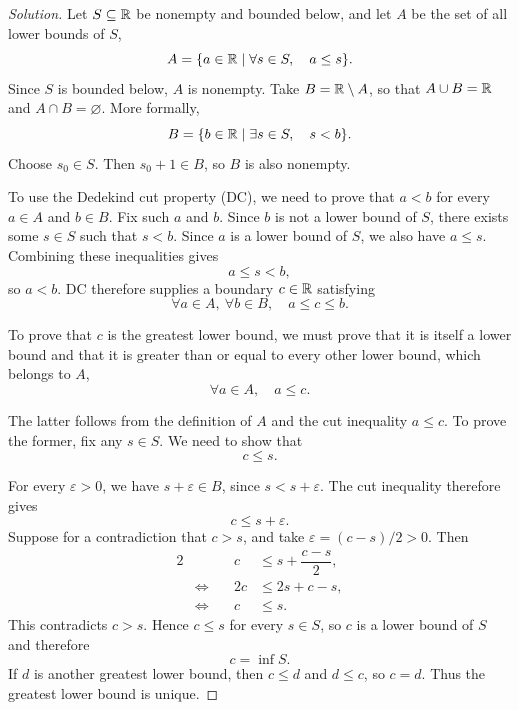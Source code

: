 \begin{proof}[Solution]
  Let $S\subseteq\mathbb{R}$ be nonempty and bounded below, and let $A$ be the
  set of all lower bounds of $S$,
  \[
    A=\{a\in\mathbb{R}\mid\forall s\in S,\quad a\leq s\}.
  \]
  Since $S$ is bounded below, $A$ is nonempty. Take $B=\mathbb{R}\setminus A$,
  so that $A\cup B=\mathbb{R}$ and $A\cap B=\varnothing$. More formally,
  \[
    B=\{b\in\mathbb{R}\mid\exists s\in S,\quad s<b\}.
  \]
  Choose $s_0\in S$. Then $s_0+1\in B$, so $B$ is also nonempty.

  To use the Dedekind cut property (DC), we need to prove that $a<b$
  for every $a\in A$ and $b\in B$. Fix such $a$ and $b$. Since $b$ is
  not a lower bound of $S$, there exists some $s\in S$ such that $s<b$.
  Since $a$ is a lower bound of $S$, we also have $a\leq s$. Combining
  these inequalities gives
  \[
    a\leq s<b,
  \]
  so $a<b$. DC therefore supplies a boundary $c\in\mathbb{R}$ satisfying
  \[
    \forall a\in A,\ \forall b\in B,\quad a\leq c\leq b.
  \]

  To prove that $c$ is the greatest lower bound, we must prove that it
  is itself a lower bound and that it is greater than or equal to every
  other lower bound, which belongs to $A$,
  \[
    \forall a\in A,\quad a\leq c.
  \]

  The latter follows from the definition of $A$ and the cut inequality
  $a\leq c$. To prove the former, fix any $s\in S$. We need to show that
  \[
    c\leq s.
  \]

  For every $\varepsilon>0$, we have $s+\varepsilon\in B$, since
  $s<s+\varepsilon$. The cut inequality therefore gives
  \[
    c\leq s+\varepsilon.
  \]
  Suppose for a contradiction that $c>s$, and take
  $\varepsilon=(c-s)/2>0$. Then
  \begin{alignat*}{2}
    &          & c  &\leq s+\dfrac{c-s}{2}, \\
    &\iff\quad & 2c &\leq 2s+c-s, \\
    &\iff\quad & c  &\leq s.
  \end{alignat*}
  This contradicts $c>s$. Hence $c\leq s$ for every $s\in S$, so $c$
  is a lower bound of $S$ and therefore
  \[
    c=\inf S.
  \]
  If $d$ is another greatest lower bound, then $c\leq d$ and $d\leq c$,
  so $c=d$. Thus the greatest lower bound is unique.
\end{proof}
